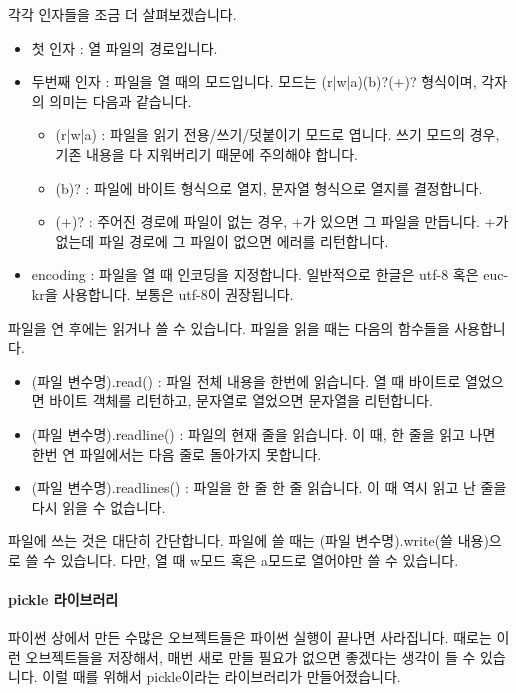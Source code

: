 \documentclass[twoside]{article}
\begin{document}
각각 인자들을 조금 더 살펴보겠습니다. 

\begin{itemize} 
\item 첫 인자 : 열 파일의 경로입니다. 
\item 두번째 인자 : 파일을 열 때의 모드입니다. 모드는 (r|w|a)(b)?(+)? 형식이며, 각자의 의미는 다음과 같습니다. 
\begin{itemize}
\item (r|w|a) : 파일을 읽기 전용/쓰기/덧붙이기 모드로 엽니다. 쓰기 모드의 경우, 기존 내용을 다 지워버리기 때문에 주의해야 합니다. 
\item (b)? : 파일에 바이트 형식으로 열지, 문자열 형식으로 열지를 결정합니다. 
\item (+)? : 주어진 경로에 파일이 없는 경우, +가 있으면 그 파일을 만듭니다. +가 없는데 파일 경로에 그 파일이 없으면 에러를 리턴합니다. 
\end{itemize}
\item encoding : 파일을 열 때 인코딩을 지정합니다. 일반적으로 한글은 utf-8 혹은 euc-kr을 사용합니다. 보통은 utf-8이 권장됩니다. 
\end{itemize}

파일을 연 후에는 읽거나 쓸 수 있습니다. 파일을 읽을 때는 다음의 함수들을 사용합니다. 
\begin{itemize}
\item (파일 변수명).read() : 파일 전체 내용을 한번에 읽습니다. 열 때 바이트로 열었으면 바이트 객체를 리턴하고, 문자열로 열었으면 문자열을 리턴합니다. 
\item (파일 변수명).readline() : 파일의 현재 줄을 읽습니다. 이 때, 한 줄을 읽고 나면 한번 연 파일에서는 다음 줄로 돌아가지 못합니다. 
\item (파일 변수명).readlines() : 파일을 한 줄 한 줄 읽습니다. 이 때 역시 읽고 난 줄을 다시 읽을 수 없습니다. 
\end{itemize}

파일에 쓰는 것은 대단히 간단합니다. 파일에 쓸 때는 (파일 변수명).write(쓸 내용)으로 쓸 수 있습니다. 다만, 열 때 w모드 혹은 a모드로 열어야만 쓸 수 있습니다. 

\paragraph{pickle 라이브러리} 파이썬 상에서 만든 수많은 오브젝트들은 파이썬 실행이 끝나면 사라집니다. 때로는 이런 오브젝트들을 저장해서, 매번 새로 만들 필요가 없으면 좋겠다는 생각이 들 수 있습니다. 이럴 때를 위해서 pickle이라는 라이브러리가 만들어졌습니다. 
\end{document}

